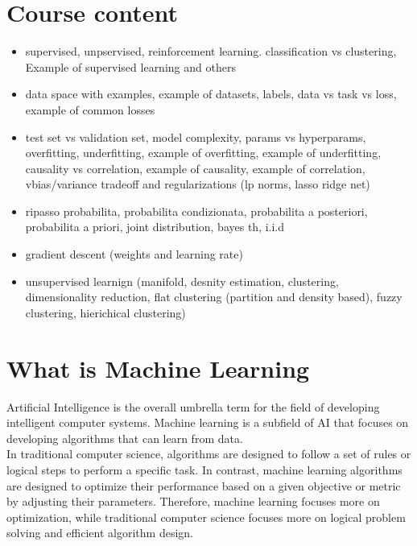 \documentclass{article}
\begin{document}
\section{Course content}
\begin{itemize}
    \item supervised, unpservised, reinforcement learning. classification vs clustering, Example of supervised learning and others
    \item data space with examples, example of datasets, labels, data vs task vs loss, example of common losses
    \item test set vs validation set, model complexity, params vs hyperparams, overfitting, underfitting, example of overfitting, example of underfitting, causality vs correlation, example of causality, example of correlation, vbias/variance tradeoff and regularizations (lp norms, lasso ridge net)
    \item ripasso probabilita, probabilita condizionata, probabilita a posteriori, probabilita a priori, joint distribution, bayes th, i.i.d
    \item gradient descent (weights and learning rate)
    \item unsupervised learnign (manifold, desnity estimation, clustering, dimensionality reduction, flat clustering (partition and density based), fuzzy clustering, hierichical clustering)
\end{itemize}

\section{What is Machine Learning}
Artificial Intelligence is the overall umbrella term for the field of developing intelligent computer systems. Machine learning is a subfield of AI that focuses on developing algorithms that can learn from data.\\
In traditional computer science, algorithms are designed to follow a set of rules or logical steps to perform a specific task.
In contrast, machine learning algorithms are designed to optimize their performance based on a given objective or metric by adjusting their parameters.
Therefore, machine learning focuses more on optimization, while traditional computer science focuses more on logical problem solving and efficient algorithm design.
\end{document}
